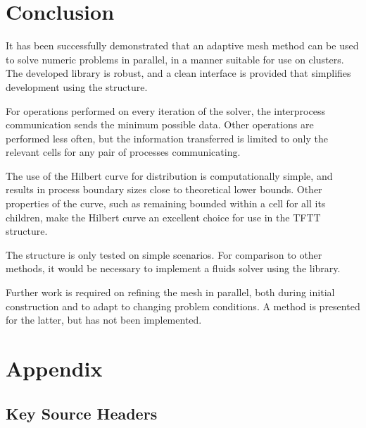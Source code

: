 \documentclass[twoside]{IIBproject}
\numberwithin{figure}{section}
\begin{document}



\section{Conclusion} %
    \label{sec:conclusions}

    It has been successfully demonstrated that an adaptive mesh method can be used to solve numeric problems in parallel, in a manner suitable for use on clusters. The developed library is robust, and a clean interface is provided that simplifies development using the structure. 

    For operations performed on every iteration of the solver, the interprocess communication sends the minimum possible data. Other operations are performed less often, but the information transferred is limited to only the relevant cells for any pair of processes communicating. 

    The use of the Hilbert curve for distribution is computationally simple, and results in process boundary sizes close to theoretical lower bounds. Other properties of the curve, such as remaining bounded within a cell for all its children, make the Hilbert curve an excellent choice for use in the TFTT structure. 

    The structure is only tested on simple scenarios. For comparison to other methods, it would be necessary to implement a fluids solver using the library.

    Further work is required on refining the mesh in parallel, both during initial construction and to adapt to changing problem conditions. A method is presented for the latter, but has not been implemented. 



\begingroup
\raggedright
\sloppy
\printbibliography[heading=bibintoc]
\endgroup


\clearpage
\appendix

\section{Appendix} %
    \label{sec:appendix}

    \subsection{Key Source Headers} %
        \label{sec:appendix-headers}
\end{document}
